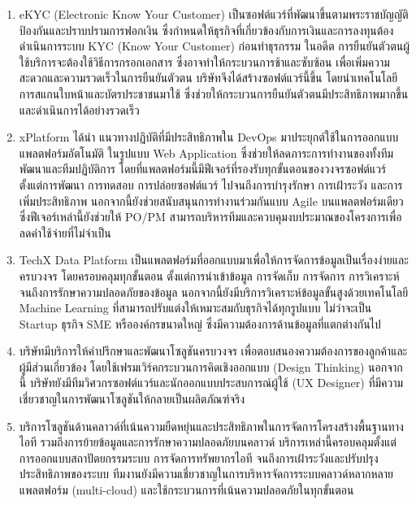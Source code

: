 \begin{enumerate}
  \item eKYC (Electronic Know Your Customer) เป็นซอฟต์แวร์ที่พัฒนาขึ้นตามพระราชบัญญัติป้องกันและปราบปรามการฟอกเงิน ซึ่งกำหนดให้ธุรกิจที่เกี่ยวข้องกับการเงินและการลงทุนต้องดำเนินการระบบ KYC (Know Your Customer) ก่อนทำธุรกรรม ในอดีต การยืนยันตัวตนผู้ใช้บริการจะต้องใช้วิธีการกรอกเอกสาร ซึ่งอาจทำให้กระบวนการช้าและซับซ้อน เพื่อเพิ่มความสะดวกและความรวดเร็วในการยืนยันตัวตน บริษัทจึงได้สร้างซอฟต์แวร์นี้ขึ้น โดยนำเทคโนโลยีการสแกนใบหน้าและบัตรประชาชนมาใช้ ซึ่งช่วยให้กระบวนการยืนยันตัวตนมีประสิทธิภาพมากขึ้นและดำเนินการได้อย่างรวดเร็ว
  \item xPlatform ได้นำ แนวทางปฏิบัติที่มีประสิทธิภาพใน DevOps มาประยุกต์ใช้ในการออกแบบแพลตฟอร์มอัตโนมัติ  ในรูปแบบ Web Application ซึ่งช่วยให้ลดภาระการทำงานของทั้งทีมพัฒนาและทีมปฏิบัติการ โดยที่แพลตฟอร์มนี้มีฟีเจอร์ที่รองรับทุกขั้นตอนของวงจรซอฟต์แวร์ ตั้งแต่การพัฒนา การทดสอบ การปล่อยซอฟต์แวร์ ไปจนถึงการบำรุงรักษา การเฝ้าระวัง และการเพิ่มประสิทธิภาพ นอกจากนี้ยังช่วยสนับสนุนการทำงานร่วมกันแบบ Agile บนแพลตฟอร์มเดียว ซึ่งฟีเจอร์เหล่านี้ยังช่วยให้ PO/PM สามารถบริหารทีมและควบคุมงบประมาณของโครงการเพื่อลดค่าใช้จ่ายที่ไม่จำเป็น
  \item TechX Data Platform เป็นแพลตฟอร์มที่ออกแบบมาเพื่อให้การจัดการข้อมูลเป็นเรื่องง่ายและครบวงจร โดยครอบคลุมทุกขั้นตอน ตั้งแต่การนำเข้าข้อมูล การจัดเก็บ การจัดการ การวิเคราะห์ จนถึงการรักษาความปลอดภัยของข้อมูล นอกจากนี้ยังมีบริการวิเคราะห์ข้อมูลขั้นสูงด้วยเทคโนโลยี Machine Learning ที่สามารถปรับแต่งให้เหมาะสมกับธุรกิจได้ทุกรูปแบบ ไม่ว่าจะเป็น Startup ธุรกิจ SME หรือองค์กรขนาดใหญ่ ซึ่งมีความต้องการด้านข้อมูลที่แตกต่างกันไป
  \item บริษัทมีบริการให้คำปรึกษาและพัฒนาโซลูชันครบวงจร เพื่อตอบสนองความต้องการของลูกค้าและผู้มีส่วนเกี่ยวข้อง โดยใช้เฟรมเวิร์คกระบวนการคิดเชิงออกแบบ (Design Thinking) นอกจากนี้ บริษัทยังมีทีมวิศวกรซอฟต์แวร์และนักออกแบบประสบการณ์ผู้ใช้ (UX Designer) ที่มีความเชี่ยวชาญในการพัฒนาโซลูชันให้กลายเป็นผลิตภัณฑ์จริง
  \item บริการโซลูชันด้านคลาวด์ที่เน้นความยืดหยุ่นและประสิทธิภาพในการจัดการโครงสร้างพื้นฐานทางไอที รวมถึงการย้ายข้อมูลและการรักษาความปลอดภัยบนคลาวด์ บริการเหล่านี้ครอบคลุมตั้งแต่การออกแบบสถาปัตยกรรมระบบ การจัดการทรัพยากรไอที จนถึงการเฝ้าระวังและปรับปรุงประสิทธิภาพของระบบ ทีมงานยังมีความเชี่ยวชาญในการบริหารจัดการระบบคลาวด์หลากหลายแพลตฟอร์ม (multi-cloud) และใช้กระบวนการที่เน้นความปลอดภัยในทุกขั้นตอน
\end{enumerate}

\renewcommand{\arraystretch}{1.2}
